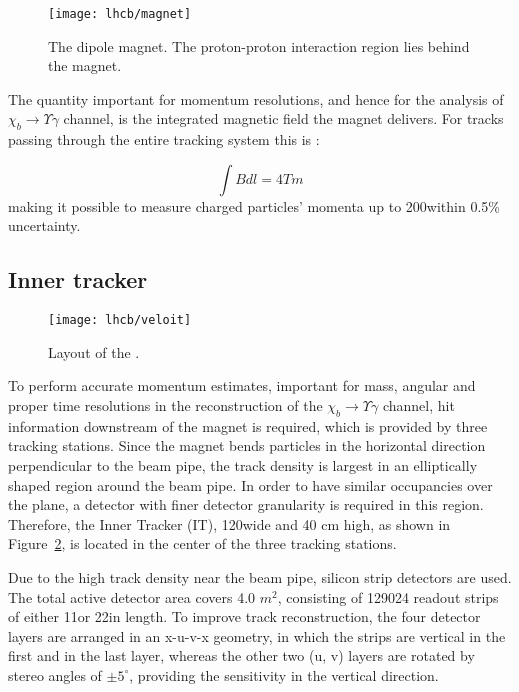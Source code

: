 \begin{figure}[tb]
\begin{center}
\texttt{[image: lhcb/magnet]}
\end{center}
\caption{\small The \lhcb dipole magnet. The proton-proton interaction
region lies behind the magnet.}
\label{fig:magnet}
\end{figure}


The quantity important for momentum resolutions, and hence for the analysis of
$\chi_b \rightarrow \Upsilon \gamma$ channel, is the integrated magnetic field
the magnet delivers. For tracks passing through the entire tracking system this
is
\cite{Alves:2008zz}:   

$$ \int Bdl = 4 Tm $$ making it possible to measure charged particles’ momenta
up to 200\gev within 0.5\% uncertainty.

\subsection{Inner tracker}

\begin{figure}[tb]
\begin{center}
\texttt{[image: lhcb/veloit]}
\end{center}
\caption{\small Layout of the \intr.}
\label{fig:veloit}
\end{figure}

To perform accurate momentum estimates, important for mass, angular and proper
time resolutions in the reconstruction of the $\chi_b \rightarrow \Upsilon
\gamma$ channel, hit information downstream of the magnet is required, which is
provided by three tracking stations. Since the magnet bends particles in the
horizontal direction perpendicular to the beam pipe, the track density is
largest in an elliptically shaped region around the beam pipe. In order to have
similar occupancies over the plane, a detector with finer detector granularity
is required in this region. Therefore, the Inner Tracker (IT), 120\cm wide and
40 cm high, as shown in Figure~\ref{fig:veloit}, is located in the center of
the three tracking stations.



Due to the high track density near the beam pipe, silicon strip detectors are
used. The total active detector area covers 4.0 $m^2$, consisting of 129024
readout strips of either 11\cm or 22\cm in length. To improve track
reconstruction, the four detector layers are arranged in an x-u-v-x geometry,
in which the strips are vertical in the first and in the last layer, whereas
the other two (u, v) layers are rotated by stereo angles of $\pm5^\circ$,
providing the sensitivity in the vertical direction.

